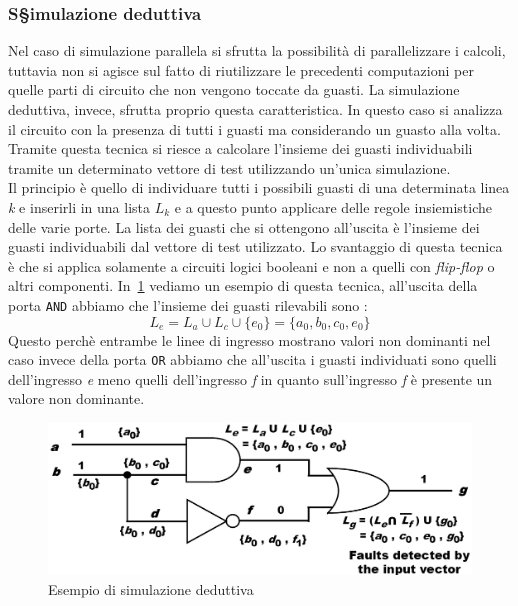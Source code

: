 \subsubsection{S§imulazione deduttiva}
Nel caso di simulazione parallela si sfrutta la possibilità di parallelizzare i calcoli, tuttavia non si agisce sul fatto di riutilizzare le precedenti computazioni per quelle parti di circuito che non vengono toccate da guasti. La simulazione deduttiva, invece, sfrutta proprio questa caratteristica.
In questo caso si analizza il circuito con la presenza di tutti i guasti ma considerando un guasto alla volta. Tramite questa tecnica si riesce a calcolare l'insieme dei guasti individuabili tramite un determinato vettore di test utilizzando un'unica simulazione.\\
Il principio è quello di individuare tutti i possibili guasti di una determinata linea \emph{k} e inserirli in una lista $L_k$ e a questo punto applicare delle regole insiemistiche delle varie porte.
La lista dei guasti che si ottengono all'uscita è l'insieme dei guasti individuabili dal vettore di test utilizzato. 
Lo svantaggio di questa tecnica è che si applica solamente a circuiti logici booleani e non a quelli con \emph{flip-flop} o altri componenti.
In \figurename\,\ref{fig:deductivesim} vediamo un esempio di questa tecnica, all'uscita della porta \texttt{AND} abbiamo che l'insieme dei guasti rilevabili sono :
$$L_e=L_a\cup L_c \cup \{e_0\}=\{a_0,b_0,c_0,e_0\}$$
Questo perchè entrambe le linee di ingresso mostrano valori non dominanti nel caso invece della porta \texttt{OR} abbiamo che all'uscita i guasti individuati sono quelli dell'ingresso \emph{e} meno quelli dell'ingresso \emph{f} in quanto sull'ingresso \emph{f} è presente un valore non dominante.
\begin{figure}
\centering
\includegraphics[scale=0.4]{img/deductivesim.png}
\caption{Esempio di simulazione deduttiva}\label{fig:deductivesim}
\end{figure}
